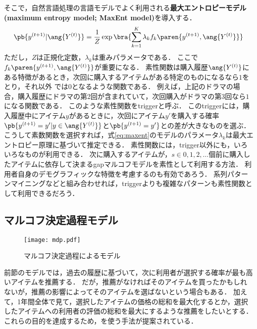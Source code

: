 そこで，自然言語処理の言語モデルでよく利用される\textbf{最大エントロピーモデル (maximum entropy model; MaxEnt model)}を導入する．
\begin{equation}
\pb{y^{(t+1)}|\ang{Y^{(t)}}}=
\frac{1}{Z}
\exp\bra{\sum_{k=1}^K\lambda_k f_k\paren{y^{(t+1)},\ang{Y^{(t)}}}}
\label{eq:maxent}
\end{equation}
ただし，$Z$は正規化定数，$\lambda_k$は重みパラメータである．
ここで $f_k\paren{y^{(t+1)},\ang{Y^{(t)}}}$が重要になる．
素性関数は購入履歴$\ang{Y^{(t)}}$にある特徴があるとき，次回に購入するアイテムがある特定のものになるなら$1$をとり，それ以外
では$0$となるような関数である．
例えば，上記のドラマの場合，購入履歴にドラマの第2回が含まれていて，次回購入がドラマの第3回なら$1$になる関数である．
このような素性関数をtriggerと呼ぶ．
このtriggerには，購入履歴中にアイテム$y$があるときに，次回にアイテム$y'$を購入する確率
$\pb{y^{(t+1)}=y'|y\in \ang{Y^{(t)}}}$と$\pb{y^{(t+1)}=y'}$との差が大きなものを選ぶ．
こうして素数関数を選択すれば，式\eqref{eq:maxent}のモデルのパラメータ$\lambda_k$は最大エントロピー原理\cite{jb:031:00}に基づいて推定できる．
素性関数には，trigger以外にも，いろいろなものが利用できる．
次に購入するアイテムが，$s\in{0,1,2,\ldots}$個前に購入したアイテムに依存して決まるgapマルコフモデルを素性として利用する方法\cite{trieice:07:01}．
利用者自身のデモグラフィックな特徴を考慮するのも有効であろう．
系列パターンマイニング\cite{eb:044:00,icde:01:02}などと組み合わせれば，triggerよりも複雑なパターンも素性関数として利用できるだろう．

\subsection{マルコフ決定過程モデル}

\begin{figure}
\centering
\texttt{[image: mdp.pdf]}
\caption{マルコフ決定過程によるモデル}
\label{fig:mdpmodel}
\end{figure}

前節のモデルでは，過去の履歴に基づいて，次に利用者が選択する確率が最も高いアイテムを推薦する．
だが，推薦がなければそのアイテムを買ったかもしれないが，推薦の影響によってそのアイテムを選ばないという場合もある．
加えて，1年間全体で見て，選択したアイテムの価格の総和を最大化するとか，選択したアイテムへの利用者の評価の総和を最大にするような推薦をしたいとする．
これらの目的を達成するため，を使う手法が提案されている\cite{uai:02:02,jmlr:05:03}．

